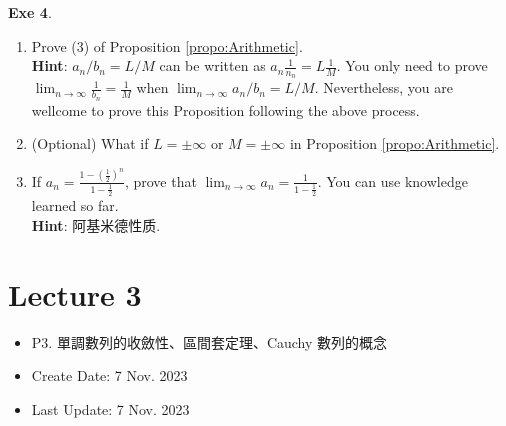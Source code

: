 \documentclass{book}
\theoremstyle{definition}
\begin{document}
\noindent\textbf{Exe 4}. 
\begin{enumerate}
    \item Prove (3) of  Proposition \ref{propo:Arithmetic}. \\
\textbf{Hint}: $a_n/b_n = L/M $ can be written as $a_n \frac{1}{n_n} = L \frac{1}{M}$. You only need to prove $\lim_{n\to \infty} \frac{1}{b_n} = \frac{1}{M}$ when $\lim_{n\to \infty} a_n/b_n = L/M $. Nevertheless, you are wellcome to prove this Proposition following the above process.
\item (Optional) What if $L=\pm \infty$  or  $M=\pm \infty$  in  Proposition \ref{propo:Arithmetic}. \\
    \item If $a_n=\frac{1-(\frac{1}{2})^n}{1-\frac{1}{2}}$, prove that  $\lim_{n\to \infty} a_n = \frac{1}{1-\frac{1}{2}}$. You can use knowledge learned so far. \\
    \textbf{Hint}: 阿基米德性质.
\end{enumerate}

\section{Lecture 3}
\begin{itemize}
    \item P3. 單調數列的收斂性、區間套定理、Cauchy 數列的概念 
    \item Create Date: 7 Nov. 2023
    \item Last Update: 7 Nov. 2023
\end{itemize}
\end{document}
